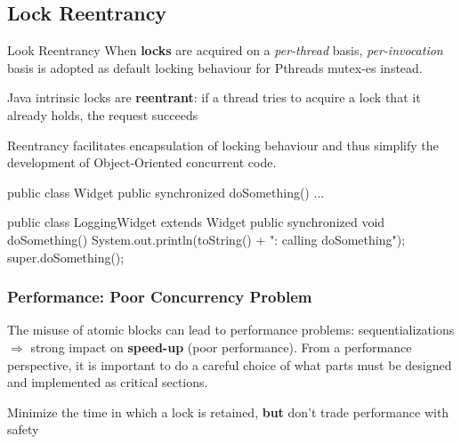 \documentclass{article}
\begin{document}
\subsection{Lock Reentrancy}\label{sub:lock_reentrancy} %
\begin{definition}{Look Reentrancy}{}
    When \textbf{locks} are acquired on a \textit{per-thread} basis, \textit{per-invocation} basis is adopted as default locking behaviour for Pthreads mutex-es instead.
\end{definition}
\begin{note}
    Java intrinsic locks are \textbf{reentrant}: if a thread tries to acquire a lock that it already holds,  the request succeeds
\end{note}
Reentrancy facilitates encapsulation of locking behaviour and thus simplify the development of Object-Oriented concurrent code.
\begin{codeblock}[java]{}
    public class Widget {
        public synchronized doSomething() {...}
    }

    public class LoggingWidget extends Widget {
        public synchronized void doSomething() {
            System.out.println(toString() + ": calling doSomething");
            super.doSomething();
        }
    }
\end{codeblock}
\begin{critical}
\end{critical}
%
\subsubsection{Performance: Poor Concurrency Problem}\label{sub:performance_poor_concurrency_problem} %
The misuse of atomic blocks can lead to performance problems: sequentializations $\Rightarrow$ strong impact on \textbf{speed-up} (poor performance).
\emptyln{}
From a performance perspective, it is important to do a careful choice of what parts must be designed and implemented as critical sections.
\begin{tip}
    Minimize the time in which a lock is retained, \textbf{but} don't trade performance with safety
\end{tip}
\end{document}
